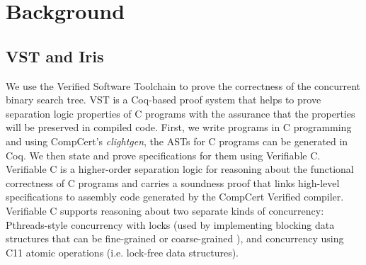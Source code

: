 \documentclass[acmsmall,screen]{acmart}\settopmatter{printfolios=true}
\begin{document}
\section{Background}
\label{background}
\subsection{VST and Iris}
We use the Verified Software Toolchain \cite{plfcc}  to prove the correctness of the concurrent binary search tree. VST is a Coq-based proof system that helps to prove separation logic properties of C programs with the assurance that the properties will be preserved in compiled code. First, we write programs in C programming and using CompCert’s \emph{clightgen}, the ASTs for C programs can be generated in Coq. We then state and prove specifications for them using Verifiable C. Verifiable C is a higher-order separation logic for reasoning about the functional correctness of C programs and carries a soundness proof that links high-level specifications to assembly code generated by the CompCert Verified compiler. Verifiable C supports reasoning about two separate kinds of concurrency:  Pthreads-style concurrency with locks (used by implementing blocking data structures that can be fine-grained or coarse-grained ), and concurrency using C11 atomic operations (i.e. lock-free data structures). 
\end{document}

